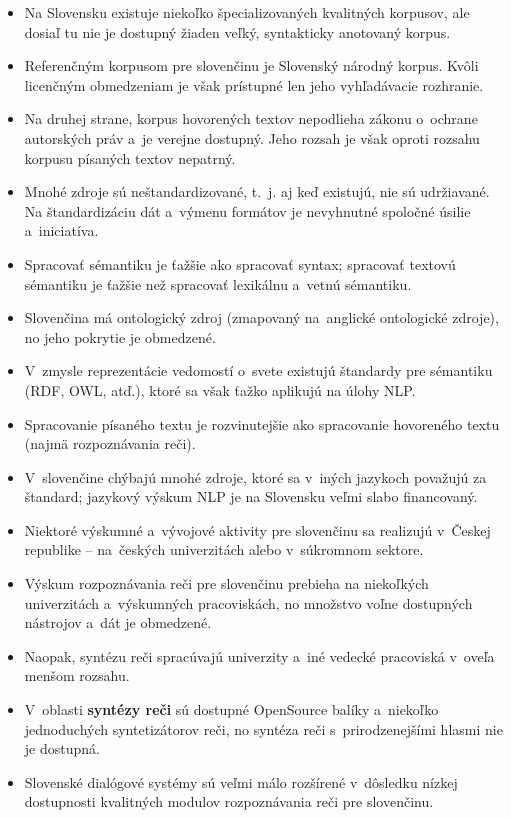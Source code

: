 \begin{multicols}{2}
\begin{itemize}
\item Na Slovensku existuje niekoľko špecializovaných kvalitných korpusov, ale dosiaľ tu nie je dostupný žiaden veľký, syntakticky anotovaný korpus.
\item Referenčným korpusom pre slovenčinu je Slovenský národný korpus. Kvôli licenčným obmedzeniam je však prístupné len jeho vyhľadávacie rozhranie.
\item Na druhej strane, korpus hovorených textov nepodlieha zákonu o~ochrane autorských práv a~je verejne dostupný. Jeho rozsah je však oproti rozsahu korpusu písaných textov nepatrný.
\item Mnohé zdroje sú neštandardizované, t.~j. aj keď existujú, nie sú udržiavané. Na štandardizáciu dát a~výmenu formátov je nevyhnutné spoločné úsilie a~iniciatíva.
\item Spracovať sémantiku je ťažšie ako spracovať syntax; spracovať textovú sémantiku je ťažšie než spracovať lexikálnu a~vetnú sémantiku.
\item Slovenčina má ontologický zdroj (zmapovaný na~anglické ontologické zdroje), no jeho pokrytie je obmedzené.
\item V~zmysle reprezentácie vedomostí o~svete existujú štandardy pre sémantiku (RDF, OWL, atď.), ktoré sa však ťažko aplikujú na úlohy NLP.
\item Spracovanie písaného textu je rozvinutejšie ako spracovanie hovoreného textu (najmä rozpoznávania reči).
\item V~slovenčine chýbajú mnohé zdroje, ktoré sa v~iných jazykoch považujú za štandard; jazykový výskum NLP je na Slovensku veľmi slabo financovaný.
\item Niektoré výskumné a~vývojové aktivity pre slovenčinu sa realizujú v~Českej republike – na~českých univerzitách alebo v~súkromnom sektore.
\item Výskum rozpoznávania reči pre slovenčinu prebieha na niekoľkých univerzitách a~výskumných pracoviskách, no množstvo voľne dostupných nástrojov a~dát je obmedzené.
\item Naopak, syntézu reči spracúvajú univerzity a~iné vedecké pracoviská v~oveľa menšom rozsahu.
\item V~oblasti \textbf{syntézy reči} sú dostupné OpenSource balíky a~niekoľko jednoduchých syntetizátorov reči, no syntéza reči s~prirodzenejšími hlasmi nie je dostupná.
\item Slovenské dialógové systémy sú veľmi málo rozšírené v~dôsledku nízkej dostupnosti kvalitných modulov rozpoznávania reči pre slovenčinu.
\end{itemize}


\end{multicols}
